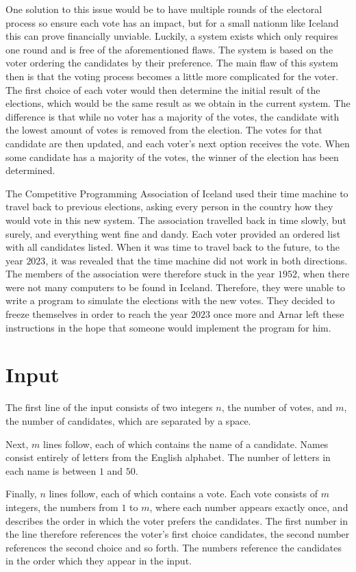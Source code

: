 One solution to this issue would be to have multiple rounds of the electoral process so ensure each vote has an impact, but for a small nationm like Iceland this can prove financially unviable.
Luckily, a system exists which only requires one round and is free of the aforementioned flaws.
The system is based on the voter ordering the candidates by their preference.
The main flaw of this system then is that the voting process becomes a little more complicated for the voter.
The first choice of each voter would then determine the initial result of the elections, which would be the same result as we obtain in the current system.
The difference is that while no voter has a majority of the votes, the candidate with the lowest amount of votes is removed from the election.
The votes for that candidate are then updated, and each voter's next option receives the vote.
When some candidate has a majority of the votes, the winner of the election has been determined.

The Competitive Programming Association of Iceland used their time machine to travel back to previous elections, asking every person in the country how they would vote in this new system.
The association travelled back in time slowly, but surely, and everything went fine and dandy.
Each voter provided an ordered list with all candidates listed.
When it was time to travel back to the future, to the year $2023$, it was revealed that the time machine did not work in both directions.
The members of the association were therefore stuck in the year $1952$, when there were not many computers to be found in Iceland.
Therefore, they were unable to write a program to simulate the elections with the new votes.
They decided to freeze themselves in order to reach the year $2023$ once more and Arnar left these instructions in the hope that someone would implement the program for him.

\section*{Input}
The first line of the input consists of two integers $n$, the number of votes, and $m$, the number of candidates, which are separated by a space.

Next, $m$ lines follow, each of which contains the name of a candidate.
Names consist entirely of letters from the English alphabet.
The number of letters in each name is between $1$ and $50$.

Finally, $n$ lines follow, each of which contains a vote.
Each vote consists of $m$ integers, the numbers from $1$ to $m$, where each number appears exactly once, and describes the order in which the voter prefers the candidates.
The first number in the line therefore references the voter's first choice candidates, the second number references the second choice and so forth.
The numbers reference the candidates in the order which they appear in the input.

